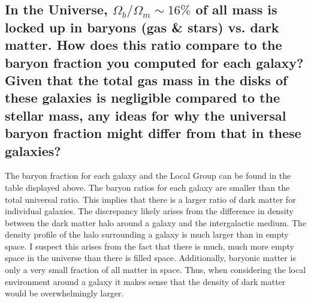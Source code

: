 \documentclass{article}
\begin{document}
\subsection{In the Universe, $\Omega_b/\Omega_m \sim 16\%$ of all mass is locked up in baryons (gas \& stars) vs. dark matter. How does this ratio compare to the baryon fraction you computed for each galaxy? Given that the total gas mass in the disks of these galaxies is negligible compared to the stellar mass, any ideas for why the universal baryon fraction might differ from that in these galaxies?}
\hspace{10mm} The baryon fraction for each galaxy and the Local Group can be found in the table displayed above. The baryon ratios for each galaxy are smaller than the total universal ratio. This implies that there is a larger ratio of dark matter for individual galaxies. The discrepancy likely arises from the difference in density between the dark matter halo around a galaxy and the intergalactic medium. The density profile of the halo surrounding a galaxy is much larger than in empty space. I suspect this arises from the fact that there is much, much more empty space in the universe than there is filled space. Additionally, baryonic matter is only a very small fraction of all matter in space. Thus, when considering the local environment around a galaxy it makes sense that the density of dark matter would be overwhelmingly larger.
\end{document}
